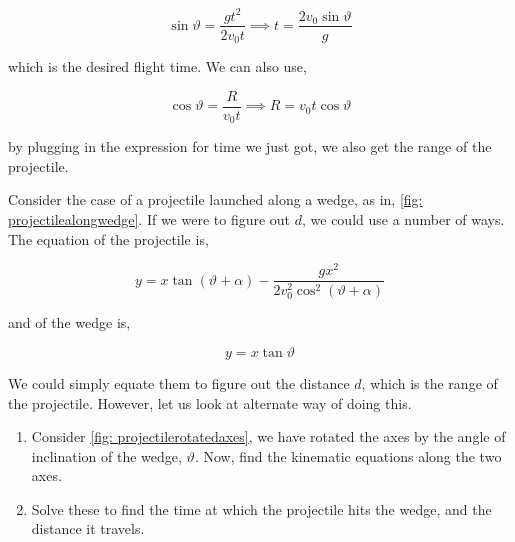 \begin{exc}
\begin{solution}
        \begin{equation*}
            \sin\vartheta = \frac{gt^2}{2v_0t} \implies t = \frac{2v_0\sin\vartheta}{g}
        \end{equation*}

        which is the desired flight time. We can also use,

        \begin{equation*}
            \cos\vartheta = \frac{R}{v_0t} \implies R = v_0t\cos\vartheta
        \end{equation*}

        by plugging in the expression for time we just got, we also get the range of the projectile. 
    \end{solution}
    
    \begin{exercise}[subtitle={Projectile Motion in tilted axes.}, points = 3]
        Consider the case of a projectile launched along a wedge, as in,
        \cref{fig: projectilealongwedge}. If we were to figure out \(d\), we could 
        use a number of ways. The equation of the projectile is,

        \begin{equation*}
            y = x\tan(\vartheta+\alpha) - \frac{gx^2}{2v_0^2\cos^2(\vartheta+\alpha)}
        \end{equation*}

        and of the wedge is,

        \begin{equation*}
            y = x\tan\vartheta 
        \end{equation*}

        We could simply equate them to figure out the distance \(d\), which is the range of the projectile.
        However, let us look at alternate way of doing this.

        \begin{enumerate}[label=(\alph*)]
            \item Consider \cref{fig: projectilerotatedaxes}, we have rotated the axes by the angle of inclination of the wedge, \(\vartheta\). Now, find the kinematic equations along the two axes.
            \item Solve these to find the time at which the projectile hits the wedge, and the distance it travels. 
        \end{enumerate}

    \end{exercise}


\end{exc}

